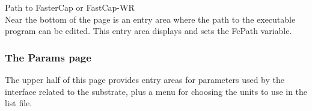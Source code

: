 \begin{description}
\item{\cb Path to FasterCap or FastCap-WR}\\
Near the bottom of the page is an entry area where the path to the
executable program can be edited.  This entry area displays and sets
the {\et FcPath} variable.
\end{description}

\subsubsection{The Params page}

The upper half of this page provides entry areas for parameters used
by the interface related to the substrate, plus a menu for choosing
the units to use in the list file.

